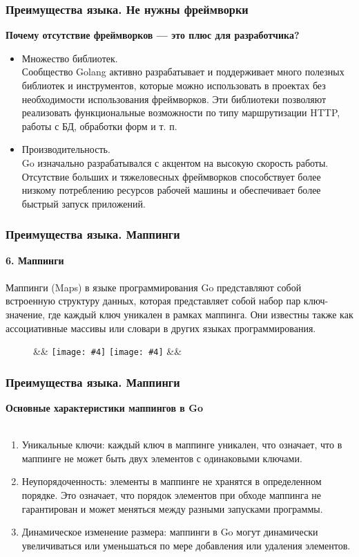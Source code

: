 \documentclass{beamer}
\newcommand{\imagebox}[6]{
      #1
      \begin{figure}[!ht]
          #2
          \ifx&#3&%
          \texttt{[image: \#4]}
          \else
          \texttt{[image: \#4]}
          \fi
          \ifx&#5&%
          \label{fig:#6}
          \else
          \caption{#5}\label{fig:#6}
          \fi
      \end{figure}
      #1 
      \phantom{imageboxfix}
  }
\begin{document}
\begin{frame}[fragile] \frametitle{Преимущества языка. Не нужны фреймворки}
  \textbf{Почему отсутствие фреймворков — это плюс для разработчика?}
  \begin{itemize}
    \item Множество библиотек.
    \\
    Сообщество Golang активно разрабатывает и поддерживает много полезных
    библиотек и инструментов, которые можно использовать в проектах без
    необходимости использования фреймворков. Эти библиотеки позволяют
    реализовать функциональные возможности по типу маршрутизации HTTP, работы с
    БД, обработки форм и т. п.
    
    \item Производительность. 
    \\
    Go изначально разрабатывался с акцентом на высокую скорость работы.
    Отсутствие больших и тяжеловесных фреймворков способствует более низкому
    потреблению ресурсов рабочей машины и обеспечивает более быстрый запуск
    приложений.
  \end{itemize}
\end{frame}
\begin{frame}[fragile] \frametitle{Преимущества языка. Маппинги}
  \textbf{6. Маппинги}
  \\\\
  Маппинги (Maps) в языке программирования Go представляют собой встроенную
  структуру данных, которая представляет собой набор пар ключ-значение, где
  каждый ключ уникален в рамках маппинга. Они известны также как ассоциативные
  массивы или словари в других языках программирования.
  
  \imagebox{}{\centering}{}{resources/02-mappings.jpg}{}{pic02}
\end{frame}
\begin{frame}[fragile] \frametitle{Преимущества языка. Маппинги}
  \textbf{Основные характеристики маппингов в Go}
  \\\\
  \begin{enumerate}
    \item Уникальные ключи: каждый ключ в маппинге уникален, что означает, что в
    маппинге не может быть двух элементов с одинаковыми ключами.
    \item Неупорядоченность: элементы в маппинге не хранятся в определенном
    порядке. Это означает, что порядок элементов при обходе маппинга не
    гарантирован и может меняться между разными запусками программы.
    \item Динамическое изменение размера: маппинги в Go могут динамически
    увеличиваться или уменьшаться по мере добавления или удаления элементов.
  \end{enumerate}
\end{frame}
\end{document}
